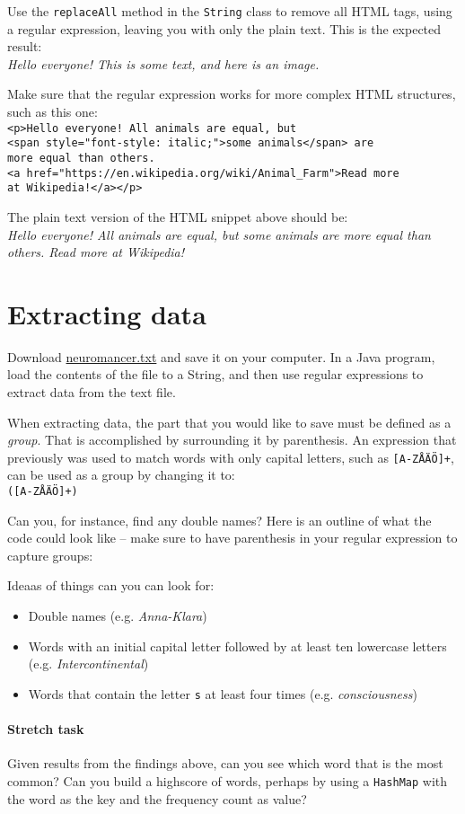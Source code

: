 \documentclass[a4paper, english]{article}
\begin{document}
        Use the \texttt{replaceAll} method in the \texttt{String} class to remove all HTML tags, using a regular expression, leaving you with only the plain text. This is the expected result: \\
        \emph{Hello everyone! This is some text, and here is an image.}

        Make sure that the regular expression works for more complex HTML structures, such as this one: \\
        \texttt{<p>Hello everyone! All animals are equal, but \\
        <span style="font-style: italic;">some animals</span> are\\
        more equal than others. \\
        <a href="https://en.wikipedia.org/wiki/Animal\_Farm">Read more \\
        at Wikipedia!</a></p>}

        The plain text version of the HTML snippet above should be: \\
        \emph{Hello everyone! All animals are equal, but some animals are more equal than others. Read more at Wikipedia!}
    
    \section{Extracting data}
        Download \href{https://archive.kottnet.net/disorganized/neuromancer.txt}{neuromancer.txt} and save it on your computer. In a Java program, load the contents of the file to a String, and then use regular expressions to extract data from the text file.

        When extracting data, the part that you would like to save must be defined as a \emph{group}. That is accomplished by surrounding it by parenthesis. An expression that previously was used to match words with only capital letters, such as \texttt{[A-ZÅÄÖ]+}, can be used as a group by changing it to: \\
        \texttt{([A-ZÅÄÖ]+)}

        Can you, for instance, find any double names? Here is an outline of what the code could look like -- make sure to have parenthesis in your regular expression to capture groups:

        

        Ideaas of things can you can look for:

        \begin{itemize}
            \item Double names (e.g. \emph{Anna-Klara})
            \item Words with an initial capital letter followed by at least ten lowercase letters (e.g. \emph{Intercontinental})
            \item Words that contain the letter \texttt{s} at least four times (e.g. \emph{consciousness})
        \end{itemize}

        \paragraph{Stretch task} Given results from the findings above, can you see which word that is the most common? Can you build a highscore of words, perhaps by using a \texttt{HashMap} with the word as the key and the frequency count as value?
\end{document}
